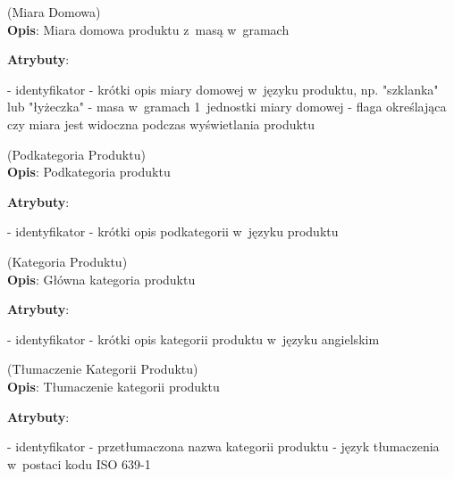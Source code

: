\begin{enumerate}[label={\textbf{KAT/1/\protect\twodigits{\theenumi}}}, wide, labelwidth=!, labelindent=0pt, labelsep=0pt, series=reqs]
    \label{kat:HouseholdMeasure} (Miara Domowa)\\
    \indent\textbf{Opis}: Miara domowa produktu z~masą w~gramach
    \par
    \textbf{Atrybuty}:
    \begin{itemize}[series=atr, wide, align=left, leftmargin=190pt]
        \label{kat:HouseholdMeasure:id}- identyfikator
        \label{kat:HouseholdMeasure:description}- krótki opis miary domowej w~języku produktu, np. "szklanka" lub "łyżeczka"
        \label{kat:HouseholdMeasure:gramsWeight}- masa w~gramach 1~jednostki miary domowej
        \label{kat:HouseholdMeasure:isVisible}- flaga określająca czy miara jest widoczna podczas wyświetlania produktu
    \end{itemize}

    \label{kat:ProductSubcategory} (Podkategoria Produktu)\\
    \indent\textbf{Opis}: Podkategoria produktu
    \par
    \textbf{Atrybuty}:
    \begin{itemize}[series=atr, wide, align=left, leftmargin=190pt]
        \label{kat:ProductSubcategory:id}- identyfikator
        \label{kat:ProductSubcategory:description}- krótki opis podkategorii w~języku produktu
    \end{itemize}

    \label{kat:ProductCategory} (Kategoria Produktu)\\
    \indent\textbf{Opis}: Główna kategoria produktu
    \par
    \textbf{Atrybuty}:
    \begin{itemize}[series=atr, wide, align=left, leftmargin=190pt]
        \label{kat:ProductCategory:id}- identyfikator
        \label{kat:ProductCategory:description}- krótki opis kategorii produktu w~języku angielskim
    \end{itemize}

    \label{kat:ProductCategoryTranslation} (Tłumaczenie Kategorii Produktu)\\
    \indent\textbf{Opis}: Tłumaczenie kategorii produktu
    \par
    \textbf{Atrybuty}:
    \begin{itemize}[series=atr, wide, align=left, leftmargin=190pt]
        \label{kat:ProductCategoryTranslation:id}- identyfikator
        \label{kat:ProductCategoryTranslation:translation}- przetłumaczona nazwa kategorii produktu
        \label{kat:ProductCategoryTranslation:language}- język tłumaczenia w~postaci kodu ISO 639-1
    \end{itemize}


\end{enumerate}
